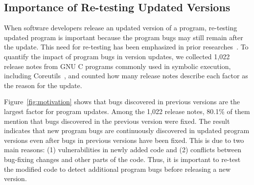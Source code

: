 \subsection{Importance of Re-testing Updated Versions}\label{sec:needtesting}

When software developers release an updated version of a program, re-testing updated program is important because the program bugs may still remain after the update. This need for re-testing has been emphasized in prior researches~\cite{wang2024efficient,xiang2024critical,yi2022feedback,guo2016conc}. To quantify the impact of program bugs in version updates, we collected 1,022 release notes from GNU C programs commonly used in symbolic execution, including Coreutils~\cite{gnu_coreutils}, and counted how many release notes describe each factor as the reason for the update. 

Figure~\ref{fig:motivation} shows that bugs discovered in previous versions are the largest factor for program updates. Among the 1,022 release notes, 80.1\% of them mention that bugs discovered in the previous version were fixed. The result indicates that new program bugs are continuously discovered in updated program versions even after bugs in previous versions have been fixed. This is due to two main reasons: (1) vulnerabilities in newly added code and (2) conflicts between bug-fixing changes and other parts of the code. Thus, it is important to re-test the modified code to detect additional program bugs before releasing a new version. 